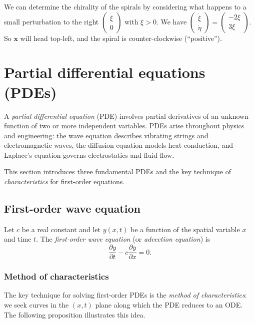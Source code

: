 \documentclass[a4paper]{article}
\begin{document}
\begin{eg}
  We can determine the chirality of the spirals by considering what happens to a small perturbation to the right $
  \begin{pmatrix}
    \xi\\0
  \end{pmatrix}$ with $\xi > 0$. We have $
  \begin{pmatrix}
    \dot\xi\\\dot\eta
  \end{pmatrix} =
  \begin{pmatrix}
    -2\xi\\3\xi
  \end{pmatrix}$. So $\mathbf{x}$ will head top-left, and the spiral is counter-clockwise (``positive'').

\end{eg}

\section{Partial differential equations (PDEs)}
A \emph{partial differential equation} (PDE) involves partial derivatives of an unknown function of two or more independent variables. PDEs arise throughout physics and engineering: the wave equation describes vibrating strings and electromagnetic waves, the diffusion equation models heat conduction, and Laplace's equation governs electrostatics and fluid flow.

This section introduces three fundamental PDEs and the key technique of \emph{characteristics} for first-order equations.

\subsection{First-order wave equation}

\begin{defi}
  Let $c$ be a real constant and let $y(x, t)$ be a function of the spatial variable $x$ and time $t$. The \emph{first-order wave equation} (or \emph{advection equation}) is
  \[
    \frac{\partial y}{\partial t} - c\frac{\partial y}{\partial x} = 0.
  \]
\end{defi}

\subsubsection*{Method of characteristics}

\begin{remark}
  The key technique for solving first-order PDEs is the \emph{method of characteristics}: we seek curves in the $(x, t)$ plane along which the PDE reduces to an ODE. The following proposition illustrates this idea.
\end{remark}
\end{document}
